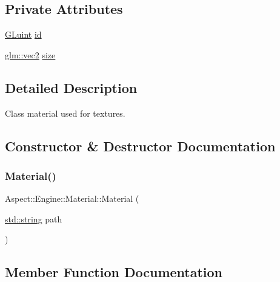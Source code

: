 \subsection*{Private Attributes}
\begin{DoxyCompactItemize}
\item 
\mbox{\hyperlink{glew_8h_a68c4714e43d8e827d80759f9cb864f3c}{G\+Luint}} \mbox{\hyperlink{class_aspect_1_1_engine_1_1_material_aa8b60314ef144a43fe75e20158295cbb}{id}}
\item 
\mbox{\hyperlink{group__core__types_gaa1618f51db67eaa145db101d8c8431d8}{glm\+::vec2}} \mbox{\hyperlink{class_aspect_1_1_engine_1_1_material_afc0e0a80a84d07e41e482ff773afbbdf}{size}}
\end{DoxyCompactItemize}


\subsection{Detailed Description}
Class material used for textures. 

\subsection{Constructor \& Destructor Documentation}
\mbox{\label{class_aspect_1_1_engine_1_1_material_a2c9f3f523dc327399c24b4222d4a978c}} 
\subsubsection{\texorpdfstring{Material()}{Material()}}
{\footnotesize\ttfamily Aspect\+::\+Engine\+::\+Material\+::\+Material (\begin{DoxyParamCaption}\item[{\mbox{\hyperlink{_s_d_l__opengl__glext_8h_ae84541b4f3d8e1ea24ec0f466a8c568b}{std\+::string}}}]{path }\end{DoxyParamCaption})}



\subsection{Member Function Documentation}
\mbox{\label{class_aspect_1_1_engine_1_1_material_ac4177400efde4d6ced260e707b3e5ad0}} 
